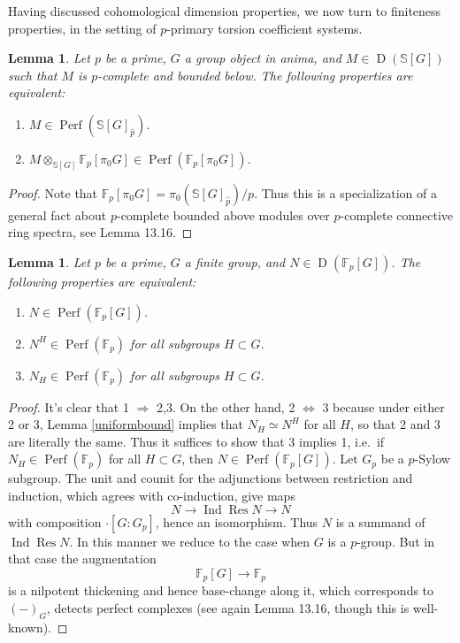 \documentclass[12pt]{article}
\newtheorem{lemma}[theorem]{Lemma}
\theoremstyle{definition}
\newcommand{\on}{\operatorname}
\newcommand{\mbb}{\mathbb}
\newcommand{\wh}{\widehat}
\begin{document}
Having discussed cohomological dimension properties, we now turn to finiteness properties, in the setting of $p$-primary torsion coefficient systems. 

\begin{lemma}\label{checkperfmodp}
Let $p$ be a prime, $G$ a group object in anima, and $M\in \on{D}(\mbb{S}[G])$ such that $M$ is $p$-complete and bounded below.  The following properties are equivalent:
\begin{enumerate}
\item $M\in\on{Perf}(\mbb{S}[G]_{\wh{p}})$.
\item $M\otimes_{\mbb{S}[G]}\mbb{F}_p[\pi_0G]\in \on{Perf}(\mbb{F}_p[\pi_0 G])$.
\end{enumerate}
\end{lemma}
\begin{proof}
Note that $\mbb{F}_p[\pi_0G] = \pi_0(\mbb{S}[G]_{\wh{p}})/p$.  Thus this is a specialization of a general fact about $p$-complete bounded above modules over $p$-complete connective ring spectra, see \cite{clausen} Lemma 13.16.
\end{proof}


\begin{lemma}\label{reducefiniteness}
Let $p$ be a prime, $G$ a finite group, and $N\in\on{D}(\mbb{F}_p[G])$.  The following properties are equivalent:
\begin{enumerate}
\item $N\in\on{Perf}(\mbb{F}_p[G])$.
\item $N^H \in \on{Perf}(\mbb{F}_p)$ for all subgroups $H\subset G$.
\item $N_H \in \on{Perf}(\mbb{F}_p)$ for all subgroups $H\subset G$.
\end{enumerate}
\end{lemma}
\begin{proof}
It's clear that 1 $\Rightarrow$ 2,3.  On the other hand, 2 $\Leftrightarrow$ 3 because under either 2 or 3, Lemma \ref{uniformbound} implies that $N_H\simeq N^H$ for all $H$, so that 2 and 3 are literally the same.  Thus it suffices to show that 3 implies 1, i.e.\ if $N_H\in \on{Perf}(\mbb{F}_p)$ for all $H\subset G$, then $N\in \on{Perf}(\mbb{F}_p[G])$.  Let $G_p$ be a $p$-Sylow subgroup.  The unit and counit for the adjunctions between restriction and induction, which agrees with co-induction, give maps
$$N \to \on{Ind}\on{Res}N \to N$$
with composition $\cdot [G:G_p]$, hence an isomorphism.  Thus $N$ is a summand of $\on{Ind}\on{Res}N$.  In this manner we reduce to the case when $G$ is a $p$-group.  But in that case the augmentation
$$\mbb{F}_p[G] \to \mbb{F}_p$$
is a nilpotent thickening and hence base-change along it, which corresponds to $(-)_G$, detects perfect complexes (see again \cite{clausen} Lemma 13.16, though this is well-known).\end{proof}
\end{document}
